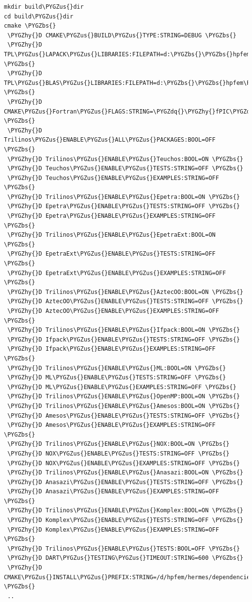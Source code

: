 \documentclass[a4paper,0pt,english]{sphinxmanual}
\def\PYGZbs{\char`\\}
\def\PYGZus{\char`\_}
\def\PYGZhy{\char`\-}
\def\PYGZdq{\char`\"}
\begin{document}
\begin{Verbatim}[commandchars=\\\{\}]
mkdir build\PYGZus{}dir
cd build\PYGZus{}dir
cmake \PYGZbs{}
 \PYGZhy{}D CMAKE\PYGZus{}BUILD\PYGZus{}TYPE:STRING=DEBUG \PYGZbs{}
 \PYGZhy{}D TPL\PYGZus{}LAPACK\PYGZus{}LIBRARIES:FILEPATH=d:\PYGZbs{}\PYGZbs{}hpfem\PYGZbs{}\PYGZbs{}hermes\PYGZbs{}\PYGZbs{}dependencies\PYGZbs{}\PYGZbs{}lib\PYGZbs{}\PYGZbs{}lapack.lib \PYGZbs{}
 \PYGZhy{}D TPL\PYGZus{}BLAS\PYGZus{}LIBRARIES:FILEPATH=d:\PYGZbs{}\PYGZbs{}hpfem\PYGZbs{}\PYGZbs{}hermes\PYGZbs{}\PYGZbs{}dependencies\PYGZbs{}\PYGZbs{}lib\PYGZbs{}\PYGZbs{}blas.lib \PYGZbs{}
 \PYGZhy{}D CMAKE\PYGZus{}Fortran\PYGZus{}FLAGS:STRING=\PYGZdq{}\PYGZhy{}fPIC\PYGZdq{} \PYGZbs{}
 \PYGZhy{}D Trilinos\PYGZus{}ENABLE\PYGZus{}ALL\PYGZus{}PACKAGES:BOOL=OFF \PYGZbs{}
 \PYGZhy{}D Trilinos\PYGZus{}ENABLE\PYGZus{}Teuchos:BOOL=ON \PYGZbs{}
 \PYGZhy{}D Teuchos\PYGZus{}ENABLE\PYGZus{}TESTS:STRING=OFF \PYGZbs{}
 \PYGZhy{}D Teuchos\PYGZus{}ENABLE\PYGZus{}EXAMPLES:STRING=OFF \PYGZbs{}
 \PYGZhy{}D Trilinos\PYGZus{}ENABLE\PYGZus{}Epetra:BOOL=ON \PYGZbs{}
 \PYGZhy{}D Epetra\PYGZus{}ENABLE\PYGZus{}TESTS:STRING=OFF \PYGZbs{}
 \PYGZhy{}D Epetra\PYGZus{}ENABLE\PYGZus{}EXAMPLES:STRING=OFF \PYGZbs{}
 \PYGZhy{}D Trilinos\PYGZus{}ENABLE\PYGZus{}EpetraExt:BOOL=ON \PYGZbs{}
 \PYGZhy{}D EpetraExt\PYGZus{}ENABLE\PYGZus{}TESTS:STRING=OFF \PYGZbs{}
 \PYGZhy{}D EpetraExt\PYGZus{}ENABLE\PYGZus{}EXAMPLES:STRING=OFF \PYGZbs{}
 \PYGZhy{}D Trilinos\PYGZus{}ENABLE\PYGZus{}AztecOO:BOOL=ON \PYGZbs{}
 \PYGZhy{}D AztecOO\PYGZus{}ENABLE\PYGZus{}TESTS:STRING=OFF \PYGZbs{}
 \PYGZhy{}D AztecOO\PYGZus{}ENABLE\PYGZus{}EXAMPLES:STRING=OFF \PYGZbs{}
 \PYGZhy{}D Trilinos\PYGZus{}ENABLE\PYGZus{}Ifpack:BOOL=ON \PYGZbs{}
 \PYGZhy{}D Ifpack\PYGZus{}ENABLE\PYGZus{}TESTS:STRING=OFF \PYGZbs{}
 \PYGZhy{}D Ifpack\PYGZus{}ENABLE\PYGZus{}EXAMPLES:STRING=OFF \PYGZbs{}
 \PYGZhy{}D Trilinos\PYGZus{}ENABLE\PYGZus{}ML:BOOL=ON \PYGZbs{}
 \PYGZhy{}D ML\PYGZus{}ENABLE\PYGZus{}TESTS:STRING=OFF \PYGZbs{}
 \PYGZhy{}D ML\PYGZus{}ENABLE\PYGZus{}EXAMPLES:STRING=OFF \PYGZbs{}
 \PYGZhy{}D Trilinos\PYGZus{}ENABLE\PYGZus{}OpenMP:BOOL=ON \PYGZbs{}
 \PYGZhy{}D Trilinos\PYGZus{}ENABLE\PYGZus{}Amesos:BOOL=ON \PYGZbs{}
 \PYGZhy{}D Amesos\PYGZus{}ENABLE\PYGZus{}TESTS:STRING=OFF \PYGZbs{}
 \PYGZhy{}D Amesos\PYGZus{}ENABLE\PYGZus{}EXAMPLES:STRING=OFF \PYGZbs{}
 \PYGZhy{}D Trilinos\PYGZus{}ENABLE\PYGZus{}NOX:BOOL=ON \PYGZbs{}
 \PYGZhy{}D NOX\PYGZus{}ENABLE\PYGZus{}TESTS:STRING=OFF \PYGZbs{}
 \PYGZhy{}D NOX\PYGZus{}ENABLE\PYGZus{}EXAMPLES:STRING=OFF \PYGZbs{}
 \PYGZhy{}D Trilinos\PYGZus{}ENABLE\PYGZus{}Anasazi:BOOL=ON \PYGZbs{}
 \PYGZhy{}D Anasazi\PYGZus{}ENABLE\PYGZus{}TESTS:STRING=OFF \PYGZbs{}
 \PYGZhy{}D Anasazi\PYGZus{}ENABLE\PYGZus{}EXAMPLES:STRING=OFF \PYGZbs{}
 \PYGZhy{}D Trilinos\PYGZus{}ENABLE\PYGZus{}Komplex:BOOL=ON \PYGZbs{}
 \PYGZhy{}D Komplex\PYGZus{}ENABLE\PYGZus{}TESTS:STRING=OFF \PYGZbs{}
 \PYGZhy{}D Komplex\PYGZus{}ENABLE\PYGZus{}EXAMPLES:STRING=OFF \PYGZbs{}
 \PYGZhy{}D Trilinos\PYGZus{}ENABLE\PYGZus{}TESTS:BOOL=OFF \PYGZbs{}
 \PYGZhy{}D DART\PYGZus{}TESTING\PYGZus{}TIMEOUT:STRING=600 \PYGZbs{}
 \PYGZhy{}D CMAKE\PYGZus{}INSTALL\PYGZus{}PREFIX:STRING=/d/hpfem/hermes/dependencies \PYGZbs{}
 ..
\end{Verbatim}
\end{document}
